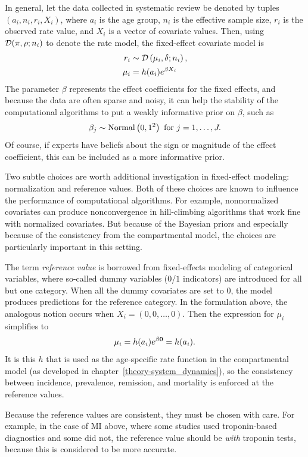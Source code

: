 In general, let the data collected in systematic review be denoted by
tuples $\left(a_i, n_i, r_i, X_i\right)$, where $a_i$ is the
age group, $n_i$ is the effective sample size, $r_i$ is the observed rate
value, and $X_i$ is a vector of covariate values. Then, using
$\mathcal{D}(\pi, \rho; n_i)$ to denote the rate model, the fixed-effect
covariate model is
\begin{align*}
r_i &\sim \mathcal{D}\left(\mu_i, \delta; n_i\right),\\
\mu_i &= h(a_i)e^{\beta X_i}
\end{align*}
The parameter $\beta$ represents the effect coefficients for
the fixed effects, and because the data are often sparse and noisy, it
can help the stability of the computational algorithms to put a weakly
informative prior on $\beta$, such as
\[
\beta_j \sim \operatorname{Normal}\left(0, 1^2\right) \text{ for } j = 1, \ldots, J.
\]
Of course, if experts have beliefs about the sign or magnitude of the
effect coefficient, this can be included as a more informative prior.

Two subtle choices are worth additional investigation in fixed-effect
modeling: normalization and reference values.  Both of these choices
are known to influence the performance of computational
algorithms.\cite{gelman_bayesian_2003} For example, nonnormalized covariates can produce
nonconvergence in hill-climbing algorithms that work fine with
normalized covariates.  But because of the Bayesian priors and
especially because of the consistency from the compartmental model,
the choices are particularly important in this setting.

The term \emph{reference value} is borrowed from fixed-effects
modeling of categorical variables, where so-called dummy variables
($0$/$1$ indicators) are introduced for all but one category. When
all the dummy covariates are set to $0$, the model produces
predictions for the reference category. In the formulation above, the
analogous notion occurs when $X_i = (0, 0, \ldots, 0)$.  Then the
expression for $\mu_i$ simplifies to
\[
\mu_i = h(a_i) e^{\beta \mathbf{0}} = h(a_i).
\]
It is this $h$ that is used as the age-specific rate function in
the compartmental model (as developed in
chapter~\ref{theory-system_dynamics}), so the consistency between
incidence, prevalence, remission, and mortality is enforced at the
reference values.

Because the reference values are consistent, they must be chosen with
care.  For example, in the case of MI above, where some studies used
troponin-based diagnostics and some did not, the reference value
should be \emph{with} troponin tests, because this is considered to be
more accurate.

